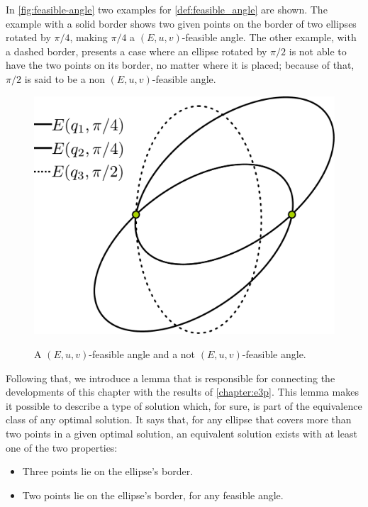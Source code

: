 In \autoref{fig:feasible-angle} two examples for \autoref{def:feasible_angle} are shown. The example with a solid border shows two given points on the border of two ellipses rotated by $\pi/4$, making $\pi/4$ a $(E, u, v)$-feasible angle.
The other example, with a dashed border, presents a case where an ellipse rotated by $\pi/2$ is not able to have the two points on its border, no matter where it is placed; because of that, $\pi/2$ is said to be a non $(E, u, v)$-feasible angle.

\begin{figure}[H]
	\centering
	\caption{A $(E, u, v)$-feasible angle and a not $(E, u, v)$-feasible angle.}
	\includegraphics[scale=.33]{tex/figures/feasible-angle2}
	\fautor
	\label{fig:feasible-angle}
\end{figure}

Following that, we introduce a lemma that is responsible for connecting the developments of this chapter with the results of \autoref{chapter:e3p}.
This lemma makes it possible to describe a type of solution which, for sure, is part of the equivalence class of any optimal solution.
It says that, for any ellipse that covers more than two points in a given optimal solution, an equivalent solution exists with at least one of the two properties:
\begin{itemize}
	\item Three points lie on the ellipse's border.
	\item Two points lie on the ellipse's border, for any feasible angle.
\end{itemize}

